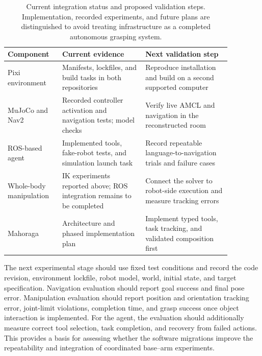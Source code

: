 \documentclass[12pt,a4paper]{article}
\begin{document}
\begin{table}[htbp]
    \centering
    \small
    \renewcommand{\arraystretch}{1.16}
    \begin{tabular}{p{0.20\linewidth} p{0.33\linewidth} p{0.34\linewidth}}
        \hline
        Component & Current evidence & Next validation step \\
        \hline
        Pixi environment &
        Manifests, lockfiles, and build tasks in both repositories &
        Reproduce installation and build on a second supported computer \\

        MuJoCo and Nav2 &
        Recorded controller activation and navigation tests; model checks &
        Verify live AMCL and navigation in the reconstructed room \\

        ROS-based agent &
        Implemented tools, fake-robot tests, and simulation launch task &
        Record repeatable language-to-navigation trials and failure cases \\

        Whole-body manipulation &
        IK experiments reported above; ROS integration remains to be completed &
        Connect the solver to robot-side execution and measure tracking errors \\

        Mahoraga &
        Architecture and phased implementation plan &
        Implement typed tools, task tracking, and validated composition first \\
        \hline
    \end{tabular}
    \caption{\small{Current integration status and proposed validation
    steps. Implementation, recorded experiments, and future plans are
    distinguished to avoid treating infrastructure as a completed
    autonomous grasping system.}}
    \label{tab:migration_integration_status}
\end{table}

The next experimental stage should use fixed test conditions and record
the code revision, environment lockfile, robot model, world, initial
state, and target specification. Navigation evaluation should report
goal success and final pose error. Manipulation evaluation should
report position and orientation tracking error, joint-limit
violations, completion time, and grasp success once object interaction
is implemented. For the agent, the evaluation should additionally
measure correct tool selection, task completion, and recovery from
failed actions. This provides a basis for assessing whether the
software migrations improve the repeatability and integration of
coordinated base--arm experiments.



\newpage
 
\end{document}
